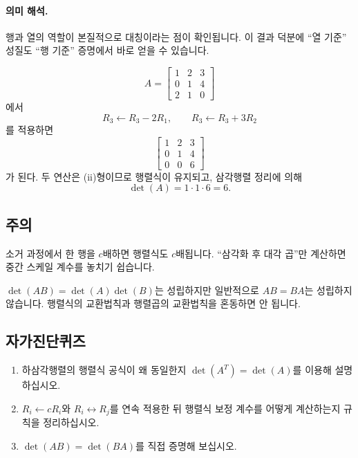 \paragraph{의미 해석.}
행과 열의 역할이 본질적으로 대칭이라는 점이 확인됩니다. 이 결과 덕분에 ``열 기준'' 성질도 ``행 기준'' 증명에서 바로 얻을 수 있습니다.

\begin{example}
$$
A=\begin{bmatrix}
1&2&3\\
0&1&4\\
2&1&0
\end{bmatrix}
$$
에서
$$
R_3\leftarrow R_3-2R_1,\qquad
R_3\leftarrow R_3+3R_2
$$
를 적용하면
$$
\begin{bmatrix}
1&2&3\\
0&1&4\\
0&0&6
\end{bmatrix}
$$
가 된다. 두 연산은 (ii)형이므로 행렬식이 유지되고, 삼각행렬 정리에 의해
$$
\det(A)=1\cdot1\cdot6=6.
$$
\end{example}

\subsection*{주의}
\begin{warning}
소거 과정에서 한 행을 $c$배하면 행렬식도 $c$배됩니다. ``삼각화 후 대각 곱''만 계산하면 중간 스케일 계수를 놓치기 쉽습니다.
\end{warning}
\begin{warning}
$\det(AB)=\det(A)\det(B)$는 성립하지만 일반적으로 $AB=BA$는 성립하지 않습니다. 행렬식의 교환법칙과 행렬곱의 교환법칙을 혼동하면 안 됩니다.
\end{warning}

\subsection*{자가진단퀴즈}
\begin{enumerate}[label=\arabic*.]
\item 하삼각행렬의 행렬식 공식이 왜 동일한지 $\det(A^T)=\det(A)$를 이용해 설명하십시오.
\item $R_i\leftarrow cR_i$와 $R_i\leftrightarrow R_j$를 연속 적용한 뒤 행렬식 보정 계수를 어떻게 계산하는지 규칙을 정리하십시오.
\item $\det(AB)=\det(BA)$를 직접 증명해 보십시오.
\end{enumerate}



